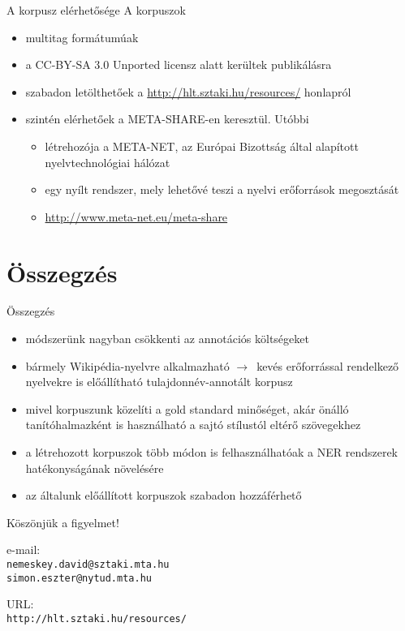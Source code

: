 \documentclass[utf8x,t]{beamer}
\newcommand{\vitem}{\item \vspace{4pt}}
\newcommand{\nyil}{$\rightarrow$\ }
\begin{document}
\begin{frame}{A korpusz elérhetősége}
\bigskip
A korpuszok
\begin{itemize}
\vitem multitag formátumúak
\vitem a CC-BY-SA 3.0 Unported licensz alatt kerültek publikálásra
\vitem szabadon letölthetőek a \url{http://hlt.sztaki.hu/resources/} honlapról
\vitem szintén elérhetőek a META-SHARE-en keresztül. Utóbbi
  \begin{itemize}
  \vitem létrehozója a META-NET, az Európai Bizottság által alapított nyelvtechnológiai hálózat
  \vitem egy nyílt rendszer, mely lehetővé teszi a nyelvi erőforrások megosztását
  \vitem \url{http://www.meta-net.eu/meta-share}
  \end{itemize}
\end{itemize}

\end{frame}

\section{Összegzés}
\begin{frame}{Összegzés}
  \bigskip
  \begin{itemize}
  \vitem módszerünk nagyban csökkenti az annotációs költségeket 
  \vitem bármely Wikipédia-nyelvre alkalmazható \nyil kevés erőforrással rendelkező nyelvekre is előállítható tulajdonnév-annotált korpusz
  \vitem mivel korpuszunk közelíti a gold standard minőséget, akár önálló tanítóhalmazként is használható a sajtó stílustól eltérő szövegekhez
  \vitem a létrehozott korpuszok több módon is felhasználhatóak a NER rendszerek hatékonyságának növelésére
  \vitem az általunk előállított korpuszok szabadon hozzáférhető
  \end{itemize}
  \vfill
\end{frame}

\begin{frame}

\bigskip

\bigskip

{\huge Köszönjük a figyelmet!}

\bigskip
\bigskip
\bigskip

e-mail: \\ {\tt nemeskey.david@sztaki.mta.hu \\ simon.eszter@nytud.mta.hu} \\

\bigskip
\bigskip

URL: \\ {\tt http://hlt.sztaki.hu/resources/}

\end{frame}
\end{document}
